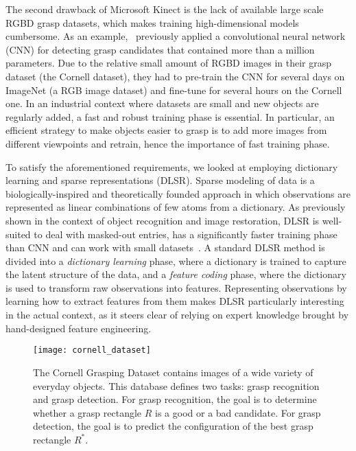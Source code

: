 \documentclass[svgnames]{scrartcl}
\begin{document}
The second drawback of Microsoft Kinect is the lack of available large scale RGBD grasp datasets, which makes training high-dimensional models cumbersome. As an example,~\citet{redmonRealtimeCnnGrasp} previously applied a convolutional neural network (CNN) for detecting grasp candidates that contained more than a million parameters. Due to the relative small amount of RGBD images in their grasp dataset (the Cornell dataset), they had to pre-train the CNN for several days on ImageNet (a RGB image dataset) and fine-tune for several hours on the Cornell one. In an industrial context where datasets are small and new objects are regularly added, a fast and robust training phase is essential. In particular, an efficient strategy to make objects easier to grasp is to add more images from different viewpoints and retrain, hence the importance of fast training phase.


To satisfy the aforementioned requirements, we looked at employing dictionary learning and sparse representations (DLSR). Sparse modeling of data is a biologically-inspired and theoretically founded approach in which observations are represented as linear combinations of few atoms from a dictionary. As previously shown in the context of object recognition and image restoration, DLSR is well-suited to deal with masked-out entries, has a significantly faster training phase than CNN and can work with small datasets~\citep{wright2010sparse}. A standard DLSR method is divided into a \textit{dictionary learning} phase, where a dictionary is trained to capture the latent structure of the data, and a \textit{feature coding} phase, where the dictionary is used to transform raw observations into features. Representing observations by learning how to extract features from them makes DLSR particularly interesting in the actual context, as it steers clear of relying on expert knowledge brought by hand-designed feature engineering.



\begin{figure}[t]
\centering
\texttt{[image: cornell\_dataset]}
\caption{The Cornell Grasping Dataset contains images of a wide variety of everyday objects. This database defines two tasks: grasp recognition and grasp detection. For grasp recognition, the goal is to determine whether a grasp rectangle $R$ is a good or a bad candidate. For grasp detection, the goal is to predict the configuration of the best grasp rectangle $R^*$.}
\label{fig:cornell_dataset}
\end{figure}
\end{document}
